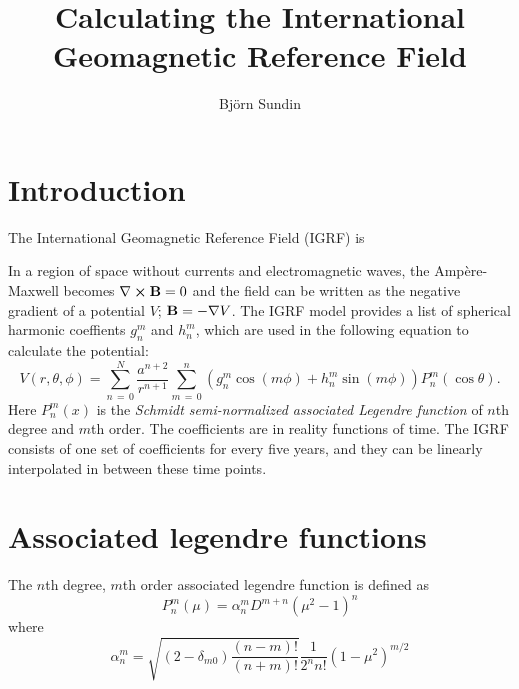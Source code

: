 \documentclass[12pt]{article}
\title{Calculating the International Geomagnetic Reference Field}
\author{Björn Sundin}
\begin{document}
\maketitle

\section{Introduction}
The International Geomagnetic Reference Field (IGRF) is 

In a region of space without currents and electromagnetic waves, the Ampère-Maxwell becomes $\nabla\crossproduct\vect{B} = 0$ and the field can be written as the negative gradient of a potential $V$; $\boldsymbol{\mathbf{B}} = -\nabla V$. The IGRF model provides a list of spherical harmonic coeffients $g_n^m$ and $h_n^m$, which are used in the following equation to calculate the potential:
\begin{equation}
  V(r, \theta, \phi) = \sum_{n\,=\,0}^N\frac{a^{n+2}}{r^{n+1}}\sum_{m\,=\,0}^n\left(g_n^m\cos(m\phi) + h_n^m\sin(m\phi)\right)P_n^m(\cos\theta).
\end{equation}
Here $P_n^m(x)$ is the \textit{Schmidt semi-normalized associated Legendre function} of $n$th degree and $m$th order. The coefficients are in reality functions of time. The IGRF consists of one set of coefficients for every five years, and they can be linearly interpolated in between these time points.


\section{Associated legendre functions}


The $n$th degree, $m$th order associated legendre function is defined as
\begin{equation}
  P_n^m(\mu) = \alpha_n^mD^{m+n}(\mu^2-1)^n
\end{equation}
where
\begin{equation}
  \alpha_n^m = \sqrt{(2-\delta_{m0})\frac{(n-m)!}{(n+m)!}}\frac{1}{2^nn!}(1-\mu^2)^{m/2}
\end{equation}
\end{document}
